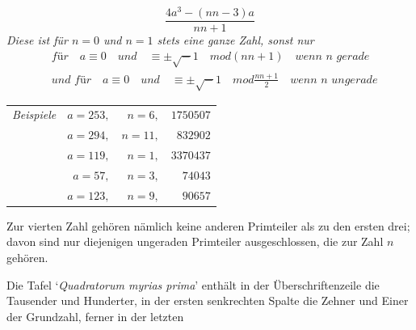 \[
\frac{4a^3-(nn-3)a}{nn+1}
\]
\textit{Diese ist für $n=0$ und $n=1$ stets eine ganze Zahl, sonst nur}
\[
\begin{aligned}
&\textit{für}\quad a\equiv0\quad\textit{und}\quad\equiv\pm\surd-1\quad mod(nn+1)\quad\textit{wenn }n\textit{ gerade}\\
&\textit{und für}\quad a\equiv0\quad\textit{und}\quad\equiv\pm\surd-1\quad mod\frac{nn+1}{2}\quad\textit{wenn }n\textit{ ungerade}
\end{aligned}
\]
\begin{center}
\begin{tabular}{lrrr}
\textit{Beispiele} & $a=253,$ & $n=6,$ & $1750507$\\
 & $a=294,$ & $n=11,$ & $832902$\\
 & $a=119,$ & $n=1,$ & $3370437$\\
 & $a=57,$ & $n=3,$ & $74043$\\
 & $a=123,$ & $n=9,$ & $90657$
\end{tabular}
\end{center}
\par Zur vierten Zahl gehören nämlich keine anderen Primteiler als zu den ersten drei; davon sind nur diejenigen ungeraden Primteiler ausgeschlossen, die zur Zahl $n$ gehören.
\par Die Tafel ‘\textit{Quadratorum myrias prima}’ enthält in der Überschriftenzeile die Tausender und Hunderter, in der ersten senkrechten Spalte die Zehner und Einer der Grundzahl, ferner in der letzten
